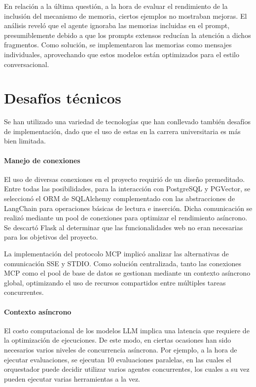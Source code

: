 En relación a la última questión, a la hora de evaluar el rendimiento de la inclusión del mecanismo de memoria, ciertos ejemplos no mostraban mejoras. El análisis reveló que el agente ignoraba las memorias incluidas en el prompt, presumiblemente debido a que los prompts extensos reducían la atención a dichos fragmentos. Como solución, se implementaron las memorias como mensajes individuales, aprovechando que estos modelos están optimizados para el estilo conversacional.

\section{Desafíos técnicos}
Se han utilizado una variedad de tecnologías que han conllevado también desafíos de implementación, dado que el uso de estas en la carrera universitaria es más bien limitada.

\paragraph{Manejo de conexiones}
El uso de diversas conexiones en el proyecto requirió de un diseño premeditado. Entre todas las posibilidades, para la interacción con PostgreSQL y PGVector, se seleccionó el ORM de SQLAlchemy complementado con las abstracciones de LangChain para operaciones básicas de lectura e inserción. Dicha comunicación se realizó mediante un pool de conexiones para optimizar el rendimiento asíncrono. Se descartó Flask al determinar que las funcionalidades web no eran necesarias para los objetivos del proyecto.

La implementación del protocolo MCP implicó analizar las alternativas de comunicación SSE y STDIO. Como solución centralizada, tanto las conexiones MCP como el pool de base de datos se gestionan mediante un contexto asíncrono global, optimizando el uso de recursos compartidos entre múltiples tareas concurrentes.

\paragraph{Contexto asíncrono}
El costo computacional de los modelos LLM implica una latencia que requiere de la optimización de ejecuciones. De este modo, en ciertas ocasiones han sido necesarios varios niveles de concurrencia asíncrona. Por ejemplo, a la hora de ejecutar evaluaciones, se ejecutan 10 evaluaciones paralelas, en las cuales el orquestador puede decidir utilizar varios agentes concurrentes, los cuales a su vez pueden ejecutar varias herramientas a la vez. 

